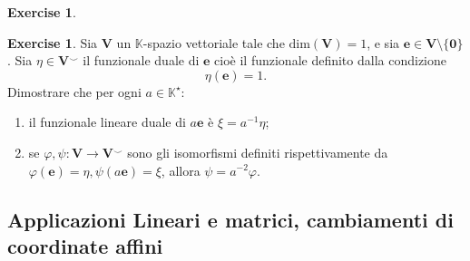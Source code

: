 \documentclass{article}
\theoremstyle{plain}
\theoremstyle{definition}
\newtheorem{xca}[exmp]{Exercise}
\theoremstyle{remark}
\begin{document}
\begin{bxthm}
\begin{xca}
\begin{multicols}{2}
\begin{enumerate}
        \end{enumerate}
    \end{multicols}
\end{xca}
\end{bxthm}

\vspace{10pt}

\begin{bxthm}
\begin{xca}
    Sia $\mathbf{V}$ un $\mathbb{K}$-spazio vettoriale tale che $\mathrm{dim}(\mathbf{V})=1$, e sia $\mathbf{e}\in\mathbf{V}\setminus\{\mathbf{0}\}$.
    Sia $\eta\in\mathbf{V}^\smallsmile$ il funzionale duale di $\mathbf{e}$ cioè il funzionale definito dalla condizione
    \[\eta(\mathbf{e})=1.\]
    Dimostrare che per ogni $a\in\mathbb{K}^\star$:
    \begin{enumerate}
        \item il funzionale lineare duale di $a\mathbf{e}$ è $\xi=a^{-1}\eta$;
        \item se $\varphi,\psi:\mathbf{V}\to\mathbf{V}^\smallsmile$ sono gli isomorfismi definiti rispettivamente da $\varphi(\mathbf{e})=\eta,\psi(a\mathbf{e})=\xi$, allora $\psi=a^{-2}\varphi$.
    \end{enumerate}
\end{xca}
\end{bxthm}

\newpage
\subsection{Applicazioni Lineari e matrici, cambiamenti di coordinate affini}
\vspace{20pt}
\end{document}
